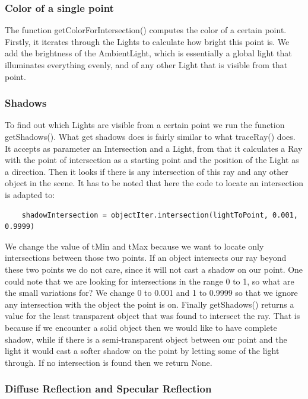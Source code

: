 \documentclass[10pt]{scrartcl}
\begin{document}
\subsubsection{ Color of a single point }
The function getColorForIntersection() computes the color of a certain point. Firstly, it iterates through the Lights to calculate how bright this point is. We add the brightness of the AmbientLight, which is essentially a global light that illuminates everything evenly, and of any other Light that is visible from that point. 

\subsubsection{ Shadows }
\par To find out which Lights are visible from a certain point we run the function getShadows(). What get shadows does is fairly similar to what traceRay() does. It accepts as parameter an Intersection and a Light, from that it calculates a Ray with the point of intersection as a starting point and the position of the Light as a direction. Then it looks if there is any intersection of this ray and any other object in the scene. It has to be noted that here the code to locate an intersection is adapted to:
\begin{lstlisting}
    shadowIntersection = objectIter.intersection(lightToPoint, 0.001, 0.9999)
\end{lstlisting}

We change the value of tMin and tMax because we want to locate only intersections between those two points. If an object intersects our ray beyond these two points we do not care, since it will not cast a shadow on our point. One could note that we are looking for intersections in the range 0 to 1, so what are the small variations for? We change 0 to 0.001 and 1 to 0.9999 so that we ignore any intersection with the object the point is on. Finally getShadows() returns a value for the least transparent object that was found to intersect the ray. That is because if we encounter a solid object then we would like to have complete shadow, while if there is a semi-transparent object between our point and the light it would cast a softer shadow on the point by letting some of the light through. If no intersection is found then we return None.
\par

\subsubsection{ Diffuse Reflection and Specular Reflection }
\end{document}
